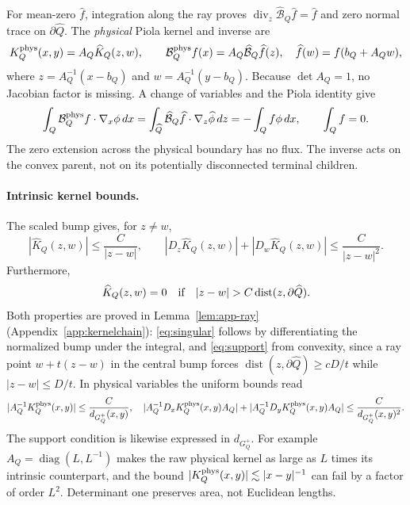 \documentclass[11pt]{article}
\theoremstyle{definition}
\theoremstyle{remark}
\numberwithin{equation}{section}
\newcommand{\divv}{\operatorname{div}}
\newcommand{\dist}{\operatorname{dist}}
\begin{document}
For mean-zero $\widehat f$, integration along the ray proves
$\divv_z\widehat{\mathcal B}_Q\widehat f=\widehat f$ and
zero normal trace on $\partial\widehat Q$.
The \emph{physical} Piola kernel and inverse are
\begin{equation}\label{eq:piolakernel}
 K_Q^{\rm phys}(x,y)=A_Q\widehat K_Q(z,w),\qquad
 \mathcal B_Q^{\rm phys}f(x)=A_Q\widehat{\mathcal B}_Q\widehat f(z),
 \quad \widehat f(w)=f(b_Q+A_Qw),
\end{equation}
where $z=A_Q^{-1}(x-b_Q)$ and $w=A_Q^{-1}(y-b_Q)$.
Because $\det A_Q=1$, no Jacobian factor is missing. A change of
variables and the Piola identity give
\begin{equation}\label{eq:weakray}
 \int_Q\mathcal B_Q^{\rm phys}f\cdot\nabla_x\phi\,dx
 =\int_{\widehat Q}\widehat{\mathcal B}_Q\widehat f
       \cdot\nabla_z\widehat\phi\,dz
 =-\int_Qf\phi\,dx,\qquad \int_Q f=0.
\end{equation}
The zero extension across the physical boundary has no flux. The inverse
acts on the convex parent, not on its potentially disconnected terminal
children.

\paragraph{Intrinsic kernel bounds.}
The scaled bump gives, for $z\ne w$,
\begin{equation}\label{eq:singular}
 |\widehat K_Q(z,w)|\le\frac{C}{|z-w|},\qquad
 |D_z\widehat K_Q(z,w)|+|D_w\widehat K_Q(z,w)|
      \le\frac{C}{|z-w|^2}.
\end{equation}
Furthermore,
\begin{equation}\label{eq:support}
 \widehat K_Q(z,w)=0\quad\hbox{if}\quad
 |z-w|>C\dist(z,\partial\widehat Q).
\end{equation}
Both properties are proved in Lemma~\ref{lem:app-ray}
(Appendix~\ref{app:kernelchain}): \eqref{eq:singular} follows by
differentiating the normalized bump under the integral, and
\eqref{eq:support} from convexity, since a ray point
$w+t(z-w)$ in the central bump forces
$\dist(z,\partial\widehat Q)\ge cD/t$ while $|z-w|\le D/t$.
In physical variables the uniform bounds read
\[
 |A_Q^{-1}K_Q^{\rm phys}(x,y)|\le\frac{C}{d_{G_Q^+}(x,y)},
 \quad
 |A_Q^{-1}D_xK_Q^{\rm phys}(x,y)A_Q|
 +|A_Q^{-1}D_yK_Q^{\rm phys}(x,y)A_Q|
 \le\frac{C}{d_{G_Q^+}(x,y)^2}.
\]
The support condition is likewise expressed in $d_{G_Q^+}$.
For example $A_Q=\operatorname{diag}(L,L^{-1})$ makes the raw physical
kernel as large as $L$ times its intrinsic counterpart, and the bound
$|K_Q^{\rm phys}(x,y)|\lesssim|x-y|^{-1}$ can fail by a factor
of order $L^2$. Determinant one preserves area, not Euclidean lengths.
\end{document}
